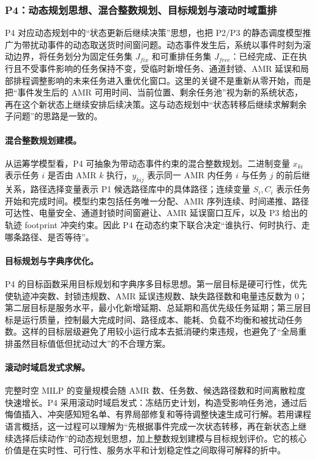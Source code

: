 \subsubsection{P4：动态规划思想、混合整数规划、目标规划与滚动时域重排}

P4 对应动态规划中的“状态更新后继续决策”思想，也把 P2/P3 的静态调度模型推广为带扰动事件的动态取送货时间窗问题。动态事件发生后，系统以事件时刻为滚动边界，将任务划分为固定任务集 $J_{fix}$ 和可重排任务集 $J_{free}$：已经完成、正在执行且不受事件影响的任务保持不变，受临时新增任务、通道封锁、AMR 延误和局部排程调整影响的未来任务进入重优化窗口。这里的关键不是重新从零开始，而是把“事件发生后的 AMR 可用时间、当前位置、剩余任务池”视为新的系统状态，再在这个新状态上继续安排后续决策。这与动态规划中“状态转移后继续求解剩余子问题”的思路是一致的。

\paragraph{混合整数规划建模。}
从运筹学模型看，P4 可抽象为带动态事件约束的混合整数规划。二进制变量 $x_{ki}$ 表示任务 $i$ 是否由 AMR $k$ 执行，$y_{kij}$ 表示同一 AMR 内任务 $i$ 与任务 $j$ 的前后继关系，路径选择变量表示 P1 候选路径库中的具体路径；连续变量 $S_i,C_i$ 表示任务开始和完成时间。模型约束包括任务唯一分配、AMR 序列连续、时间递推、路径可达性、电量安全、通道封锁时间窗避让、AMR 延误窗口互斥，以及 P3 给出的轨迹 footprint 冲突约束。因此 P4 在动态约束下联合决定“谁执行、何时执行、走哪条路径、是否等待”。

\paragraph{目标规划与字典序优化。}
P4 的目标函数采用目标规划和字典序多目标思想。第一层目标是硬可行性，优先使轨迹冲突数、封锁违规数、AMR 延误违规数、缺失路径数和电量违反数为 0；第二层目标是服务水平，最小化新增延期、总延期和高优先级任务延期；第三层目标是运行质量，控制最大完成时间、路径成本、能耗、负载不均衡和被扰动任务数。这样的目标层级避免了用较小运行成本去抵消硬约束违规，也避免了“全局重排虽然目标值低但扰动过大”的不合理方案。

\paragraph{滚动时域启发式求解。}
完整时空 MILP 的变量规模会随 AMR 数、任务数、候选路径数和时间离散粒度快速增长。P4 采用滚动时域启发式：冻结历史计划，构造受影响任务池，通过后悔值插入、冲突感知短名单、有界局部修复和等待调整快速生成可行解。若用课程语言概括，这一过程可以理解为“先根据事件完成一次状态转移，再在新状态上继续选择后续动作”的动态规划思想，加上整数规划建模与目标规划评价。它的核心价值是在实时性、可行性、服务水平和计划稳定性之间取得可解释的折中。
